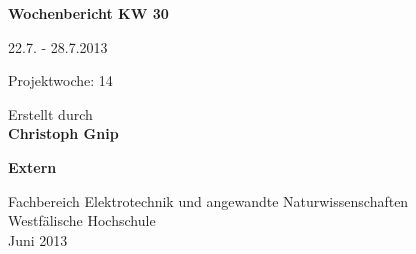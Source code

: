 
\begin{center}
{\Huge \textbf{Wochenbericht KW 30}\par}
\vspace{1cm}
{\Huge 22.7. - 28.7.2013\par}
\vspace{1cm}
{\Huge Projektwoche: 14\par}

\vspace{2cm}

\large{Erstellt durch}\\
\Large{\textbf{Christoph Gnip}}

\vspace{4cm}

\Large{\textbf{Extern}}

\vfill

{\normalsize Fachbereich Elektrotechnik und angewandte Naturwissenschaften\\
Westfälische Hochschule\\[2ex]Juni 2013}

\end{center}
\newpage